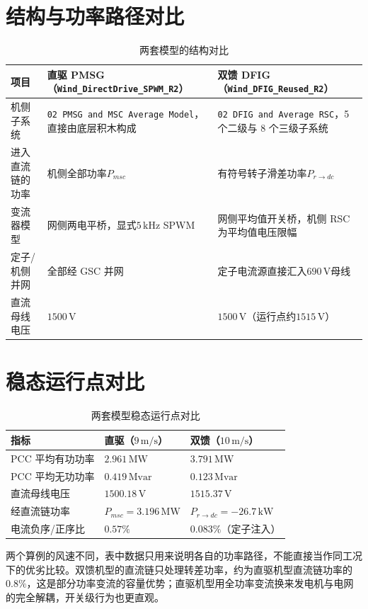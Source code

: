 \documentclass[UTF8,zihao=-4,fontset=none]{ctexrep}
\newcommand{\modelname}{\texttt{Wind\_DirectDrive\_SPWM\_R2}}
\newcommand{\dfigmodelname}{\texttt{Wind\_DFIG\_Reused\_R2}}
\begin{document}
\section{结构与功率路径对比}
\begin{table}[H]
\centering
\caption{两套模型的结构对比}
\begin{tabular}{p{3.4cm}p{4.9cm}p{4.9cm}}
\toprule
项目 & 直驱 PMSG（\modelname） & 双馈 DFIG（\dfigmodelname）\\
\midrule
机侧子系统 & \texttt{02 PMSG and MSC Average Model}，直接由底层积木构成 & \texttt{02 DFIG and Average RSC}，5 个二级与 8 个三级子系统\\
进入直流链的功率 & 机侧全部功率\(P_{msc}\) & 有符号转子滑差功率\(P_{r\to dc}\)\\
变流器模型 & 网侧两电平桥，显式\(5\,\mathrm{kHz}\) SPWM & 网侧平均值开关桥，机侧 RSC 为平均值电压限幅\\
定子/机侧并网 & 全部经 GSC 并网 & 定子电流源直接汇入\(690\,\mathrm{V}\)母线\\
直流母线电压 & \(1500\,\mathrm{V}\) & \(1500\,\mathrm{V}\)（运行点约\(1515\,\mathrm{V}\)）\\
\bottomrule
\end{tabular}
\end{table}

\section{稳态运行点对比}
\begin{table}[H]
\centering
\caption{两套模型稳态运行点对比}
\begin{tabular}{p{4.6cm}p{3.9cm}p{4.0cm}}
\toprule
指标 & 直驱（\(9\,\mathrm{m/s}\)） & 双馈（\(10\,\mathrm{m/s}\)）\\
\midrule
PCC 平均有功功率 & \(2.961\,\mathrm{MW}\) & \(3.791\,\mathrm{MW}\)\\
PCC 平均无功功率 & \(0.419\,\mathrm{Mvar}\) & \(0.123\,\mathrm{Mvar}\)\\
直流母线电压 & \(1500.18\,\mathrm{V}\) & \(1515.37\,\mathrm{V}\)\\
经直流链功率 & \(P_{msc}=3.196\,\mathrm{MW}\) & \(P_{r\to dc}=-26.7\,\mathrm{kW}\)\\
电流负序/正序比 & \(0.57\%\) & \(0.083\%\)（定子注入）\\
\bottomrule
\end{tabular}
\end{table}
两个算例的风速不同，表中数据只用来说明各自的功率路径，不能直接当作同工况下的优劣比较。双馈机型的直流链只处理转差功率，约为直驱机型直流链功率的\(0.8\%\)，这是部分功率变流的容量优势；直驱机型用全功率变流换来发电机与电网的完全解耦，开关级行为也更直观。
\end{document}
